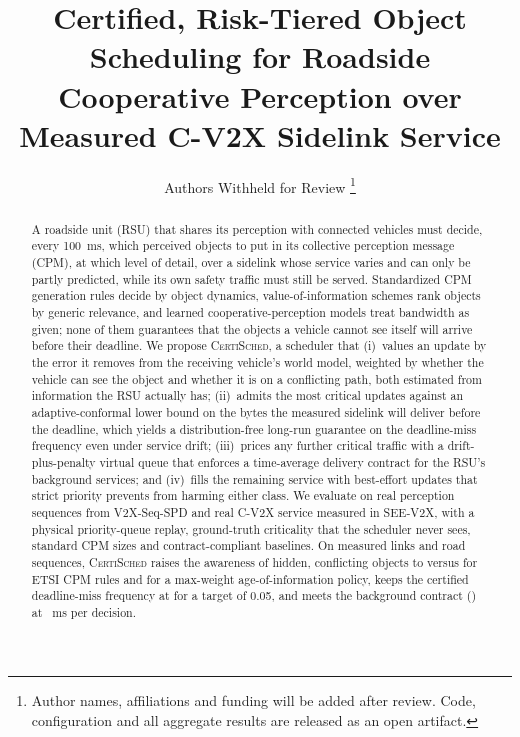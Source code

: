 \documentclass[journal]{IEEEtran}
\theoremstyle{remark}
\newcommand{\cs}{\textsc{CertiSched}}
\begin{document}
\title{Certified, Risk-Tiered Object Scheduling for Roadside Cooperative Perception over Measured C-V2X Sidelink Service}

\author{Authors Withheld for Review%
\thanks{Author names, affiliations and funding will be added after review. Code, configuration and all aggregate results are released as an open artifact.}}


\maketitle

\begin{abstract}
A roadside unit (RSU) that shares its perception with connected vehicles must decide, every 100~ms, which perceived objects to put in its collective perception message (CPM), at which level of detail, over a sidelink whose service varies and can only be partly predicted, while its own safety traffic must still be served. Standardized CPM generation rules decide by object dynamics, value-of-information schemes rank objects by generic relevance, and learned cooperative-perception models treat bandwidth as given; none of them guarantees that the objects a vehicle cannot see itself will arrive before their deadline. We propose \cs, a scheduler that (i)~values an update by the error it removes from the receiving vehicle's world model, weighted by whether the vehicle can see the object and whether it is on a conflicting path, both estimated from information the RSU actually has; (ii)~admits the most critical updates against an adaptive-conformal lower bound on the bytes the measured sidelink will deliver before the deadline, which yields a distribution-free long-run guarantee on the deadline-miss frequency even under service drift; (iii)~prices any further critical traffic with a drift-plus-penalty virtual queue that enforces a time-average delivery contract for the RSU's background services; and (iv)~fills the remaining service with best-effort updates that strict priority prevents from harming either class. We evaluate on real perception sequences from V2X-Seq-SPD and real C-V2X service measured in SEE-V2X, with a physical priority-queue replay, ground-truth criticality that the scheduler never sees, standard CPM sizes and contract-compliant baselines. On \resLinks{} measured links and \resSequences{} road sequences, \cs{} raises the awareness of hidden, conflicting objects to \resCertischedCriticalAwareness{} versus \resEtsiCpmRulesCriticalAwareness{} for ETSI CPM rules and \resMaxWeightAoiCriticalAwareness{} for a max-weight age-of-information policy, keeps the certified deadline-miss frequency at \resCertischedCertWindowMiss{} for a target of 0.05, and meets the background contract (\resCertischedBackgroundDelivery{}) at \resCertischedDecisionMs{}~ms per decision.
\end{abstract}
\end{document}
